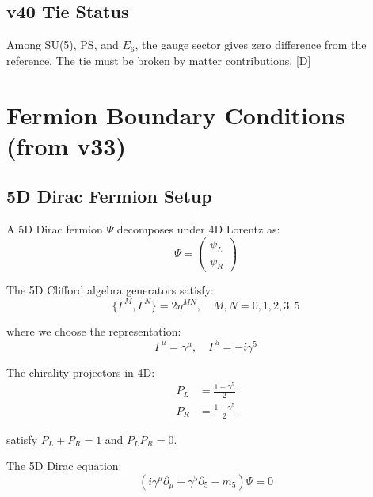 \documentclass[11pt,a4paper]{article}
\newcommand{\tagD}{\textcolor{blue!70!black}{[D]}}
\begin{document}
\subsection{v40 Tie Status}

Among SU(5), PS, and $E_6$, the gauge sector gives zero difference from the reference.
The tie must be broken by matter contributions. \tagD

\section{Fermion Boundary Conditions (from v33)}
\label{sec:fermion-bc}

\subsection{5D Dirac Fermion Setup}

A 5D Dirac fermion $\Psi$ decomposes under 4D Lorentz as:
\begin{equation}
\label{eq:5d-dirac}
\Psi = \begin{pmatrix} \psi_L \\ \psi_R \end{pmatrix}
\end{equation}

The 5D Clifford algebra generators satisfy:
\begin{equation}
\label{eq:clifford-5d}
\{\Gamma^M, \Gamma^N\} = 2\eta^{MN}, \quad M, N = 0, 1, 2, 3, 5
\end{equation}

where we choose the representation:
\begin{equation}
\label{eq:gamma-rep}
\Gamma^\mu = \gamma^\mu, \quad \Gamma^5 = -i\gamma^5
\end{equation}

The chirality projectors in 4D:
\begin{align}
\label{eq:PL-def}
P_L &= \frac{1 - \gamma^5}{2} \\
\label{eq:PR-def}
P_R &= \frac{1 + \gamma^5}{2}
\end{align}

satisfy $P_L + P_R = 1$ and $P_L P_R = 0$.

The 5D Dirac equation:
\begin{equation}
\label{eq:dirac-5d}
(i\gamma^\mu \partial_\mu + \gamma^5 \partial_5 - m_5) \Psi = 0
\end{equation}
\end{document}
